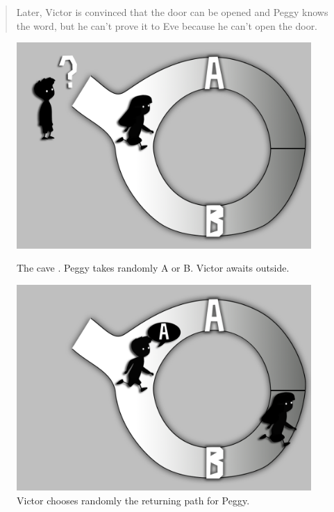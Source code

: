 \begin{otherlanguage}{english}
\begin{quote}
	Later, Victor is convinced that the door can be opened and Peggy knows the word, but he can't prove it to Eve because he can't open the door. 
\end{quote}


\begin{figure}[!htb]
	\includegraphics[width=\linewidth]{gfx/graficoJL_ZKP_1}
	\caption*{The cave \citep{ZKPcave:fig}. Peggy takes randomly A or B. Victor awaits outside.}\label{fig:1}
	\endminipage\hfill
	\includegraphics[width=\linewidth]{gfx/graficoJL_ZKP_2}
	\caption*{Victor chooses randomly the returning path for Peggy.}\label{fig:2}
	\endminipage\hfill

\end{figure}
\end{otherlanguage}
